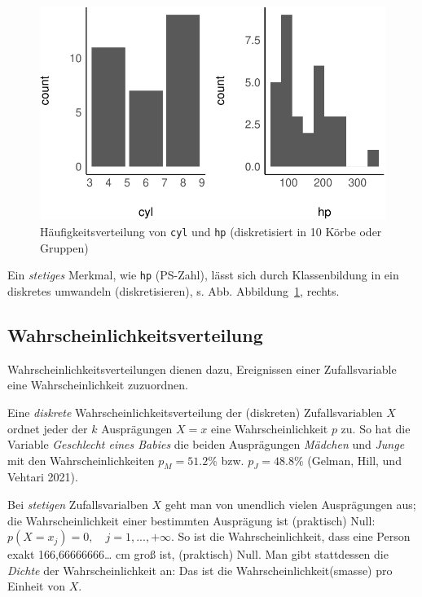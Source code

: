 \documentclass[
  a4paper,
  DIV=11]{scrreprt}
\theoremstyle{definition}
\theoremstyle{remark}
\begin{document}
\begin{figure}

{\centering \includegraphics{./Verteilungen_files/figure-pdf/fig-mtcars-freq-1.pdf}

}

\caption{\label{fig-mtcars-freq}Häufigkeitsverteilung von \texttt{cyl}
und \texttt{hp} (diskretisiert in 10 Körbe oder Gruppen)}

\end{figure}

Ein \emph{stetiges} Merkmal, wie \texttt{hp} (PS-Zahl), lässt sich durch
Klassenbildung in ein diskretes umwandeln (diskretisieren), s. Abb.
Abbildung~\ref{fig-mtcars-freq}, rechts.

\hypertarget{wahrscheinlichkeitsverteilung}{%
\subsection{Wahrscheinlichkeitsverteilung}\label{wahrscheinlichkeitsverteilung}}

Wahrscheinlichkeitsverteilungen dienen dazu, Ereignissen einer
Zufallsvariable eine Wahrscheinlichkeit zuzuordnen.

Eine \emph{diskrete} Wahrscheinlichkeitsverteilung der (diskreten)
Zufallsvariablen \(X\) ordnet jeder der \(k\) Ausprägungen \(X=x\) eine
Wahrscheinlichkeit \(p\) zu. So hat die Variable \emph{Geschlecht eines
Babies} die beiden Ausprägungen \emph{Mädchen} und \emph{Junge} mit den
Wahrscheinlichkeiten \(p_M = 51.2\%\) bzw. \(p_J = 48.8\%\) (Gelman,
Hill, und Vehtari 2021).

Bei \emph{stetigen} Zufallsvarialben \(X\) geht man von unendlich vielen
Ausprägungen aus; die Wahrscheinlichkeit einer bestimmten Ausprägung ist
(praktisch) Null: \(p(X=x_j)=0, \quad j=1,...,+\infty\). So ist die
Wahrscheinlichkeit, dass eine Person exakt 166,66666666\ldots{} cm groß
ist, (praktisch) Null. Man gibt stattdessen die \emph{Dichte} der
Wahrscheinlichkeit an: Das ist die Wahrscheinlichkeit(smasse) pro
Einheit von \(X\).
\end{document}
